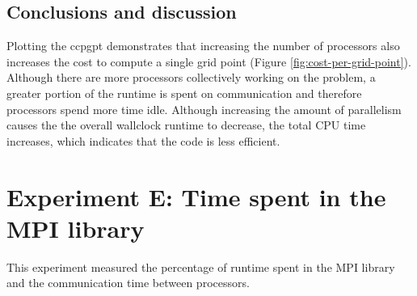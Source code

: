 \documentclass[a4paper,11pt]{report}
\begin{document}
\subsection{Conclusions and discussion}
Plotting the \gls{ccpgpt} demonstrates that increasing the number of processors also increases the cost to compute a single grid point (Figure \ref{fig:cost-per-grid-point}). Although there are more processors collectively working on the problem, a greater portion of the runtime is spent on communication and therefore processors spend more time idle. Although increasing the amount of parallelism causes the the overall wallclock runtime to decrease, the total CPU time increases, which indicates that the code is less efficient. 

\section{Experiment E: Time spent in the MPI library}
This experiment measured the percentage of runtime spent in the MPI library and the communication time between processors. 
\end{document}
